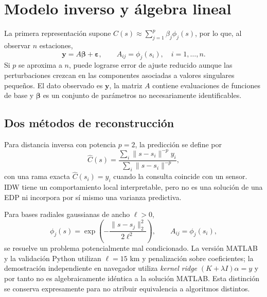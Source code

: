 \section{Modelo inverso y álgebra lineal}\label{sec:inverso}
La primera representación supone $C(s)\approx \sum_{j=1}^p\beta_j\phi_j(s)$, por lo que, al observar $n$ estaciones,
\begin{equation}\boldsymbol y=A\boldsymbol\beta+\boldsymbol\varepsilon,\qquad A_{ij}=\phi_j(s_i),\quad i=1,\dots,n.\label{eq:observacion}\end{equation}
Si $p$ se aproxima a $n$, puede lograrse error de ajuste reducido aunque las perturbaciones crezcan en las componentes asociadas a valores singulares pequeños. El dato observado es $\boldsymbol y$, la matriz $A$ contiene evaluaciones de funciones de base y $\boldsymbol\beta$ es un conjunto de parámetros no necesariamente identificables.

\subsection{Dos métodos de reconstrucción}
Para distancia inversa con potencia $p=2$, la predicción se define por
\begin{equation}\widehat C(s)=\frac{\sum_i \|s-s_i\|^{-p}y_i}{\sum_i\|s-s_i\|^{-p}},\label{eq:idw}\end{equation}
con una rama exacta $\widehat C(s_i)=y_i$ cuando la consulta coincide con un sensor. IDW tiene un comportamiento local interpretable, pero no es una solución de una EDP ni incorpora por sí mismo una varianza predictiva.

Para bases radiales gaussianas de ancho $\ell>0$,
\begin{equation}\phi_j(s)=\exp\!\left(-\frac{\|s-s_j\|_2^2}{2\ell^2}\right),\qquad A_{ij}=\phi_j(s_i),\label{eq:rbf}\end{equation}
se resuelve un problema potencialmente mal condicionado. La versión MATLAB y la validación Python utilizan $\ell=15$ km y penalización sobre coeficientes; la demostración independiente en navegador utiliza \emph{kernel ridge} $(K+\lambda I)\alpha=y$ y por tanto no es algebraicamente idéntica a la solución MATLAB. Esta distinción se conserva expresamente para no atribuir equivalencia a algoritmos distintos.

